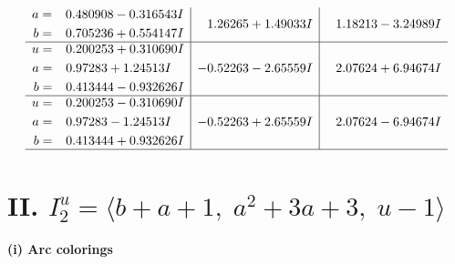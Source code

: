 \documentclass[1p]{elsarticle_modified}
\theoremstyle{definition}
\begin{document}
$$\begin{array}{c|c|c}
\begin{aligned}
a &= \phantom{-}0.480908 - 0.316543 I \\
b &= \phantom{-}0.705236 + 0.554147 I\end{aligned}
 & \phantom{-}1.26265 + 1.49033 I & \phantom{-}1.18213 - 3.24989 I \\ \hline\begin{aligned}
u &= \phantom{-}0.200253 + 0.310690 I \\
a &= \phantom{-}0.97283 + 1.24513 I \\
b &= \phantom{-}0.413444 - 0.932626 I\end{aligned}
 & -0.52263 - 2.65559 I & \phantom{-}2.07624 + 6.94674 I \\ \hline\begin{aligned}
u &= \phantom{-}0.200253 - 0.310690 I \\
a &= \phantom{-}0.97283 - 1.24513 I \\
b &= \phantom{-}0.413444 + 0.932626 I\end{aligned}
 & -0.52263 + 2.65559 I & \phantom{-}2.07624 - 6.94674 I\\
 \hline 
 \end{array}$$\newpage\newpage\renewcommand{\arraystretch}{1}
\centering \section*{II. $I^u_{2}= \langle b+a+1,\;a^2+3 a+3,\;u-1 \rangle$}
\flushleft \textbf{(i) Arc colorings}\\
\end{document}

